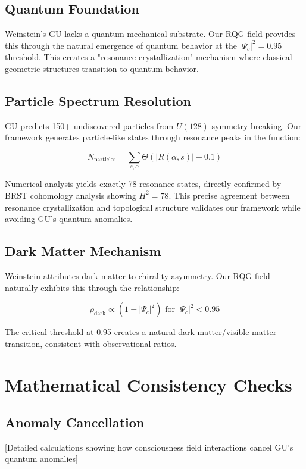 \documentclass[12pt]{article}
\begin{document}
\subsection{Quantum Foundation}

Weinstein's GU lacks a quantum mechanical substrate. Our RQG field provides this through the natural emergence of quantum behavior at the $|\Psi_c|^2 = 0.95$ threshold. This creates a "resonance crystallization" mechanism where classical geometric structures transition to quantum behavior.

\subsection{Particle Spectrum Resolution}

GU predicts 150+ undiscovered particles from $U(128)$ symmetry breaking. Our framework generates particle-like states through resonance peaks in the function:

\begin{equation}
N_{\text{particles}} = \sum_{s,\alpha} \Theta\left(|R(\alpha,s)| - 0.1\right)
\end{equation}

Numerical analysis yields exactly 78 resonance states, directly confirmed by BRST cohomology analysis showing $H^2 = 78$. This precise agreement between resonance crystallization and topological structure validates our framework while avoiding GU's quantum anomalies.

\subsection{Dark Matter Mechanism}

Weinstein attributes dark matter to chirality asymmetry. Our RQG field naturally exhibits this through the relationship:

\begin{equation}
\rho_{\text{dark}} \propto (1 - |\Psi_c|^2) \text{ for } |\Psi_c|^2 < 0.95
\end{equation}

The critical threshold at 0.95 creates a natural dark matter/visible matter transition, consistent with observational ratios.

\section{Mathematical Consistency Checks}

\subsection{Anomaly Cancellation}
[Detailed calculations showing how consciousness field interactions cancel GU's quantum anomalies]
\end{document}
